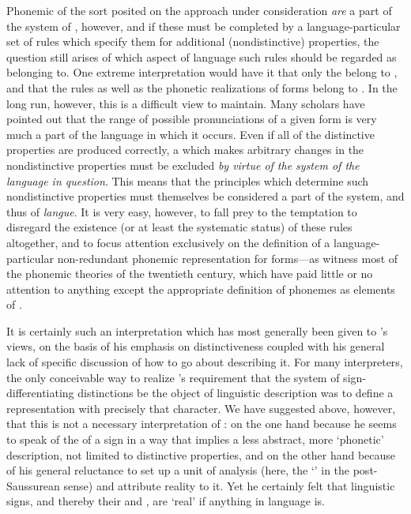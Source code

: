 Phonemic  of the sort posited on the approach under
consideration \emph{are} a part of the system of \emph{},
however, and if these must be completed by a language-particular set
of {rules} which specify them for additional (nondistinctive)
properties, the question still arises of which aspect of language such
{rules} should be regarded as belonging to. One extreme interpretation
would have it that only the  belong to
\emph{}, and that the {rules} as well as the phonetic realizations
of forms belong to \emph{}. In the long run, however, this is a
difficult view to maintain. Many scholars have pointed out that the
range of possible pronunciations of a given form is very much a part
of the language in which it occurs. Even if all of the distinctive
properties are produced correctly, a  which makes
arbitrary changes in the nondistinctive properties must be excluded
\emph{by virtue of the system of the language in question}. This means
that the principles which determine such nondistinctive properties
must themselves be considered a part of the system, and thus of
\emph{langue}. It is very easy, however, to fall prey to the
temptation to disregard the existence (or at least the systematic
status) of these {rules} altogether, and to focus attention exclusively
on the definition of a language-particular non-redundant phonemic
representation for forms—as witness most of the phonemic theories of
the twentieth century, which have paid little or no attention to
anything except the appropriate definition of phonemes as elements of
.

It is certainly such an interpretation which has most generally been
given to {\Saussure}'s views, on the basis of his emphasis on
distinctiveness coupled with his general lack of specific discussion
of how to go about describing it. For many interpreters, the only
conceivable way to realize {\Saussure}'s requirement that the system of
sign-differentiating distinctions be the object of linguistic
description was to define a representation with precisely that
character. We have suggested above, however, that this is not a
necessary interpretation of {\Saussure}: on the one hand because he seems
to speak of the \emph{} of a sign in a way that implies a
less abstract, more `phonetic' description, not limited to distinctive
properties, and on the other hand because of his general reluctance to
set up a unit of analysis (here, the `' in the post-Saussurean
sense) and attribute reality to it. Yet he certainly felt that
linguistic signs, and thereby their \emph{} and
\emph{}, are `real' if anything in language is.

